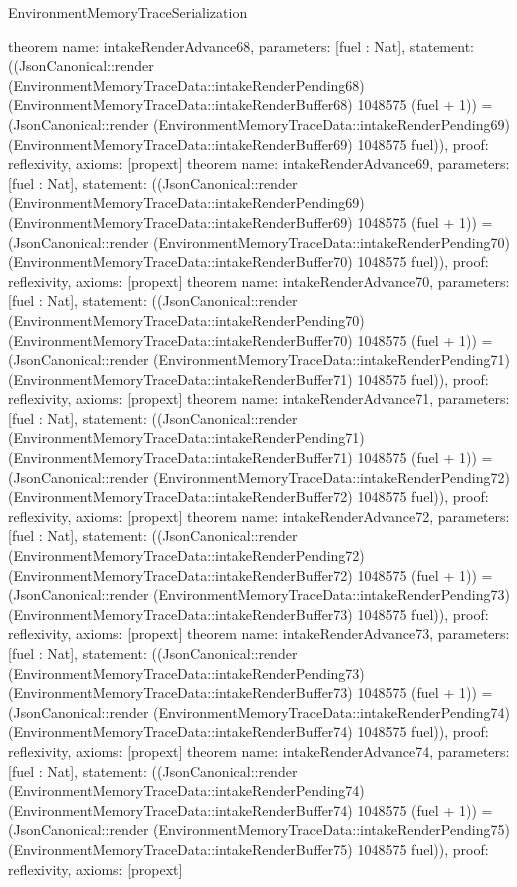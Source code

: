 \begin{lexlean}{EnvironmentMemoryTraceSerialization}
\begin{semanticmodule}
{}
theorem{
 name: intakeRenderAdvance68, parameters: [fuel : Nat],
 statement: ((JsonCanonical::render (EnvironmentMemoryTraceData::intakeRenderPending68) (EnvironmentMemoryTraceData::intakeRenderBuffer68) 1048575 (fuel + 1)) = (JsonCanonical::render (EnvironmentMemoryTraceData::intakeRenderPending69) (EnvironmentMemoryTraceData::intakeRenderBuffer69) 1048575 fuel)), proof: reflexivity{}, axioms: [propext]
}
theorem{
 name: intakeRenderAdvance69, parameters: [fuel : Nat],
 statement: ((JsonCanonical::render (EnvironmentMemoryTraceData::intakeRenderPending69) (EnvironmentMemoryTraceData::intakeRenderBuffer69) 1048575 (fuel + 1)) = (JsonCanonical::render (EnvironmentMemoryTraceData::intakeRenderPending70) (EnvironmentMemoryTraceData::intakeRenderBuffer70) 1048575 fuel)), proof: reflexivity{}, axioms: [propext]
}
theorem{
 name: intakeRenderAdvance70, parameters: [fuel : Nat],
 statement: ((JsonCanonical::render (EnvironmentMemoryTraceData::intakeRenderPending70) (EnvironmentMemoryTraceData::intakeRenderBuffer70) 1048575 (fuel + 1)) = (JsonCanonical::render (EnvironmentMemoryTraceData::intakeRenderPending71) (EnvironmentMemoryTraceData::intakeRenderBuffer71) 1048575 fuel)), proof: reflexivity{}, axioms: [propext]
}
theorem{
 name: intakeRenderAdvance71, parameters: [fuel : Nat],
 statement: ((JsonCanonical::render (EnvironmentMemoryTraceData::intakeRenderPending71) (EnvironmentMemoryTraceData::intakeRenderBuffer71) 1048575 (fuel + 1)) = (JsonCanonical::render (EnvironmentMemoryTraceData::intakeRenderPending72) (EnvironmentMemoryTraceData::intakeRenderBuffer72) 1048575 fuel)), proof: reflexivity{}, axioms: [propext]
}
theorem{
 name: intakeRenderAdvance72, parameters: [fuel : Nat],
 statement: ((JsonCanonical::render (EnvironmentMemoryTraceData::intakeRenderPending72) (EnvironmentMemoryTraceData::intakeRenderBuffer72) 1048575 (fuel + 1)) = (JsonCanonical::render (EnvironmentMemoryTraceData::intakeRenderPending73) (EnvironmentMemoryTraceData::intakeRenderBuffer73) 1048575 fuel)), proof: reflexivity{}, axioms: [propext]
}
theorem{
 name: intakeRenderAdvance73, parameters: [fuel : Nat],
 statement: ((JsonCanonical::render (EnvironmentMemoryTraceData::intakeRenderPending73) (EnvironmentMemoryTraceData::intakeRenderBuffer73) 1048575 (fuel + 1)) = (JsonCanonical::render (EnvironmentMemoryTraceData::intakeRenderPending74) (EnvironmentMemoryTraceData::intakeRenderBuffer74) 1048575 fuel)), proof: reflexivity{}, axioms: [propext]
}
theorem{
 name: intakeRenderAdvance74, parameters: [fuel : Nat],
 statement: ((JsonCanonical::render (EnvironmentMemoryTraceData::intakeRenderPending74) (EnvironmentMemoryTraceData::intakeRenderBuffer74) 1048575 (fuel + 1)) = (JsonCanonical::render (EnvironmentMemoryTraceData::intakeRenderPending75) (EnvironmentMemoryTraceData::intakeRenderBuffer75) 1048575 fuel)), proof: reflexivity{}, axioms: [propext]
}
\end{semanticmodule}
\end{lexlean}

